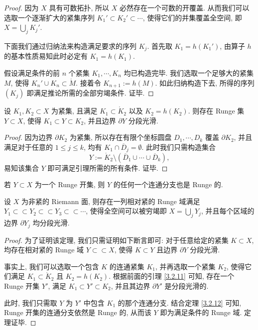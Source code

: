\begin{proof}
因为 $X$ 具有可数拓扑, 所以 $X$ 必然存在一个可数的开覆盖. 从而我们可以选取一个逐渐扩大的紧集序列 $K_1' \subset K_2' \subset \cdots$, 使得它们的并集覆盖全空间, 即 $X = \bigcup_j K_j'$. 

下面我们通过归纳法来构造满足要求的序列 $K_j$. 首先取 $K_1 = h(K_1')$, 由算子 $h$ 的基本性质易知此时必定有 $K_1 = h(K_1)$. 

假设满足条件的前 $n$ 个紧集 $K_1, \cdots, K_n$ 均已构造完毕. 我们选取一个足够大的紧集 $M$, 使得 $K_n' \cup K_n \subset \mathring{M}$. 接着令 $K_{n+1} := h(M)$. 如此归纳构造下去, 所得的序列 $(K_j)$ 即满足推论所需的全部穷竭条件. 证毕. 
\end{proof}

\begin{lemma}\label{3.2.11}
设 $K_1, K_2 \subset X$ 为紧集, 且满足 $K_1 \subset \mathring{K}_2$ 以及 $K_2 = h(K_2)$. 则存在 Runge 集 $Y \subset X$, 使得 $K_1 \subset Y \subset K_2$, 并且边界 $\partial Y$ 分段光滑.
\end{lemma}

\begin{proof}
因为边界 $\partial K_2$ 为紧集, 所以存在有限个坐标圆盘 $D_1, \cdots, D_k$ 覆盖 $\partial K_2$, 并且满足对于任意的 $1 \leqslant j \leqslant k$, 均有 $K_1 \cap \overline{D}_j = \emptyset$. 此时我们只需构造集合
\[ Y := \mathring{K}_2 \setminus (\overline{D}_1 \cup \cdots \cup \overline{D}_k), \]
易知该集合 $Y$ 即可满足引理所需的所有条件. 证毕.
\end{proof}

\begin{theorem}\label{3.2.12}
若 $Y \subset X$ 为一个 Runge 开集, 则 $Y$ 的任何一个连通分支也是 Runge 的.
\end{theorem}

\begin{theorem}\label{3.2.13}
设 $X$ 为非紧的 Riemann 面, 则存在一列相对紧的 Runge 域满足 $Y_1 \subset\subset Y_2 \subset\subset Y_3 \subset\subset \cdots$, 使得全空间可以被穷竭即 $X = \bigcup_j Y_j$, 并且每个区域的边界 $\partial Y_j$ 均分段光滑.
\end{theorem}

\begin{proof}
为了证明该定理, 我们只需证明如下断言即可: 对于任意给定的紧集 $K \subset X$, 均存在相对紧的 Runge 域 $Y \subset\subset X$, 使得 $K \subset Y$ 且边界 $\partial Y$ 分段光滑.

事实上, 我们可以选取一个包含 $K$ 的连通紧集 $K_1$, 并再选取一个紧集 $K_2$, 使得它们满足 $K_1 \subset \mathring{K}_2$ 且 $K_2 = h(K_2)$. 根据前面的引理 \ref{3.2.11} 可知, 存在一个 Runge 开集 $Y'$, 满足 $K_1 \subset Y' \subset K_2$, 并且其边界 $\partial Y'$ 是分段光滑的.

此时, 我们只需取 $Y$ 为 $Y'$ 中包含 $K_1$ 的那个连通分支. 结合定理 \ref{3.2.12} 可知, Runge 开集的连通分支依然是 Runge 的, 从而该 $Y$ 即为满足条件的 Runge 域. 定理证毕.
\end{proof}

